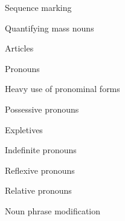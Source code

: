 \begin{listWWNumviileveli}
\begin{listWWNumviilevelii}
\begin{listWWNumviileveliii}
\item 
\begin{styleListParagraph}
Sequence marking 
\end{styleListParagraph}

\item 
\begin{styleListParagraph}
Quantifying mass nouns 
\end{styleListParagraph}

\item 
\begin{styleListParagraph}
Articles 
\end{styleListParagraph}

\end{listWWNumviileveliii}
\item 
\begin{styleListParagraph}
Pronouns
\end{styleListParagraph}


\setcounter{listWWNumviileveliii}{0}
\begin{listWWNumviileveliii}
\item 
\begin{styleListParagraph}
Heavy use of pronominal forms
\end{styleListParagraph}

\item 
\begin{styleListParagraph}
Possessive pronouns 
\end{styleListParagraph}

\item 
\begin{styleListParagraph}
Expletives 
\end{styleListParagraph}

\item 
\begin{styleListParagraph}
Indefinite pronouns 
\end{styleListParagraph}

\item 
\begin{styleListParagraph}
Reflexive pronouns 
\end{styleListParagraph}

\item 
\begin{styleListParagraph}
Relative pronouns 
\end{styleListParagraph}

\end{listWWNumviileveliii}
\item 
\begin{styleListParagraph}
Noun phrase modification 
\end{styleListParagraph}



\end{listWWNumviilevelii}
\end{listWWNumviileveli}
